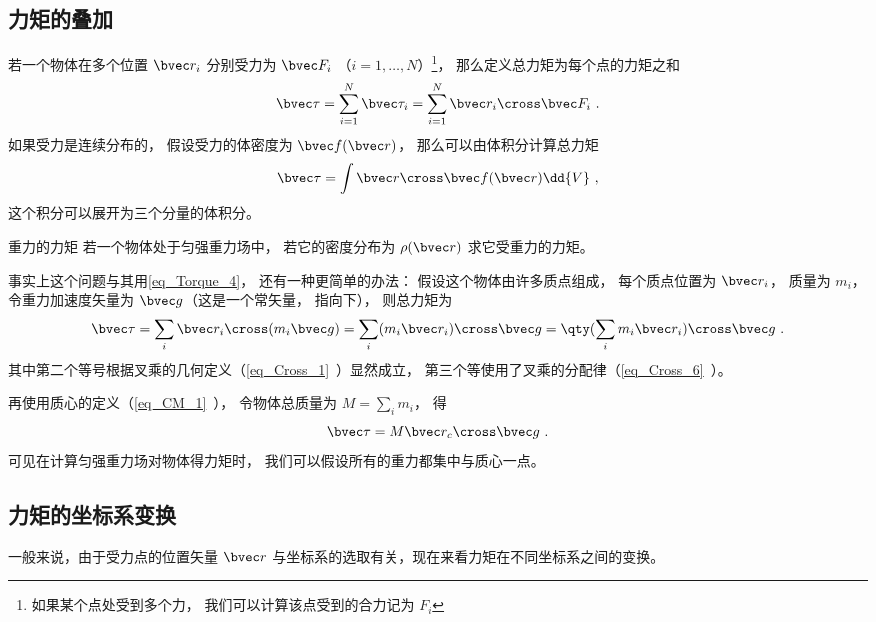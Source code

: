 \subsection{力矩的叠加}

若一个物体在多个位置 $\bvec r_i$ 分别受力为 $\bvec F_i$ （$i = 1, \dots, N$）\footnote{如果某个点处受到多个力， 我们可以计算该点受到的合力记为 $F_i$}， 那么定义总力矩为每个点的力矩之和
\begin{equation}
\bvec \tau = \sum_{i=1}^N \bvec \tau_i = \sum_{i=1}^N \bvec r_i \cross \bvec F_i~.
\end{equation}
如果受力是连续分布的， 假设受力的体密度为 $\bvec f(\bvec r)$， 那么可以由体积分计算总力矩
\begin{equation}\label{eq_Torque_4}
\bvec \tau = \int \bvec r \cross \bvec f(\bvec r) \dd{V}~,
\end{equation}
这个积分可以展开为三个分量的体积分。

\begin{example}{重力的力矩}\label{ex_Torque_1}
若一个物体处于匀强重力场中， 若它的密度分布为 $\rho(\bvec r)$ 求它受重力的力矩。

事实上这个问题与其用\autoref{eq_Torque_4}， 还有一种更简单的办法： 假设这个物体由许多质点组成， 每个质点位置为 $\bvec r_i$， 质量为 $m_i$， 令重力加速度矢量为 $\bvec g$（这是一个常矢量， 指向下）， 则总力矩为
\begin{equation}
\bvec \tau = \sum_i \bvec r_i \cross (m_i \bvec g) = \sum_i (m_i \bvec r_i) \cross \bvec g = \qty(\sum_i m_i \bvec r_i) \cross \bvec g~.
\end{equation}
其中第二个等号根据叉乘的几何定义（\autoref{eq_Cross_1}~）显然成立， 第三个等使用了叉乘的分配律（\autoref{eq_Cross_6}~）。


再使用质心的定义（\autoref{eq_CM_1}~）， 令物体总质量为 $M = \sum_i m_i$， 得
\begin{equation}
\bvec \tau = M \bvec r_c \cross \bvec g~.
\end{equation}
可见在计算匀强重力场对物体得力矩时， 我们可以假设所有的重力都集中与质心一点。
\end{example}

\subsection{力矩的坐标系变换}\label{sub_Torque_1}
一般来说，由于受力点的位置矢量 $\bvec r$ 与坐标系的选取有关，现在来看力矩在不同坐标系之间的变换。

